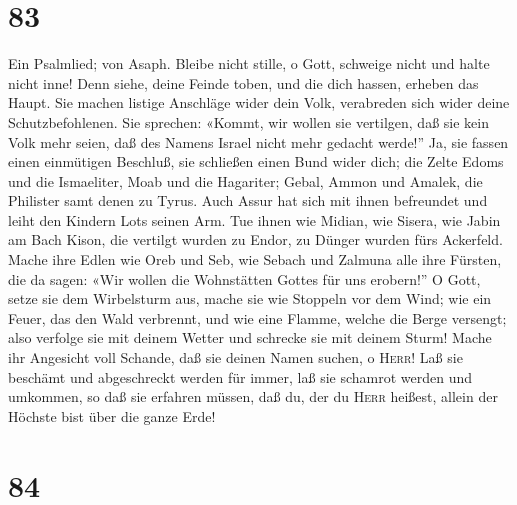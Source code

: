 \hypertarget{section-82}{%
\section{83}\label{section-82}}

 Ein Psalmlied; von Asaph. Bleibe nicht stille, o Gott,
schweige nicht und halte nicht inne!  Denn siehe, deine
Feinde toben, und die dich hassen, erheben das Haupt.  Sie
machen listige Anschläge wider dein Volk, verabreden sich wider deine
Schutzbefohlenen.  Sie sprechen: «Kommt, wir wollen sie
vertilgen, daß sie kein Volk mehr seien, daß des Namens Israel nicht
mehr gedacht werde!''  Ja, sie fassen einen einmütigen
Beschluß, sie schließen einen Bund wider dich;  die Zelte
Edoms und die Ismaeliter, Moab und die Hagariter;  Gebal,
Ammon und Amalek, die Philister samt denen zu Tyrus.  Auch
Assur hat sich mit ihnen befreundet und leiht den Kindern Lots seinen
Arm.  Tue ihnen wie Midian, wie Sisera, wie Jabin am Bach
Kison,  die vertilgt wurden zu Endor, zu Dünger wurden
fürs Ackerfeld.  Mache ihre Edlen wie Oreb und Seb, wie
Sebach und Zalmuna alle ihre Fürsten,  die da sagen: «Wir
wollen die Wohnstätten Gottes für uns erobern!''  O Gott,
setze sie dem Wirbelsturm aus, mache sie wie Stoppeln vor dem Wind;
 wie ein Feuer, das den Wald verbrennt, und wie eine
Flamme, welche die Berge versengt;  also verfolge sie mit
deinem Wetter und schrecke sie mit deinem Sturm!  Mache
ihr Angesicht voll Schande, daß sie deinen Namen suchen, o
\textsc{Herr}!  Laß sie beschämt und abgeschreckt werden
für immer, laß sie schamrot werden und umkommen,  so daß
sie erfahren müssen, daß du, der du \textsc{Herr} heißest, allein der
Höchste bist über die ganze Erde!

\hypertarget{section-83}{%
\section{84}\label{section-83}}

